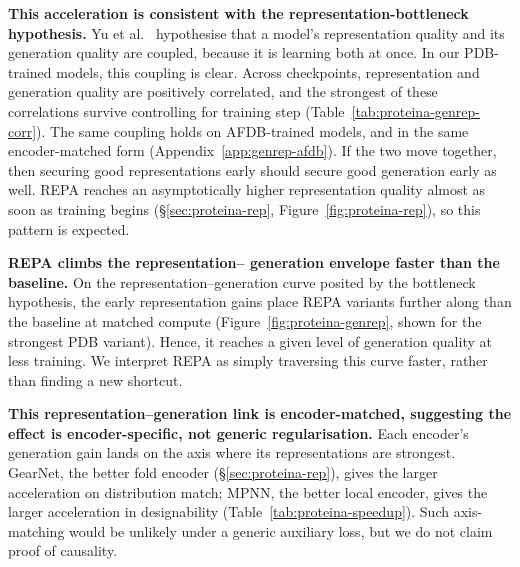 \documentclass[12pt,a4paper,twoside]{report}
\begin{document}
\textbf{This acceleration is consistent with the representation-bottleneck hypothesis.} Yu et al.~\cite{REPA} hypothesise that a model's representation quality and its generation quality are coupled, because it is learning both at once. In our PDB-trained models, this coupling is clear. Across checkpoints, representation and generation quality are positively correlated, and the strongest of these correlations survive controlling for training step (Table~\ref{tab:proteina-genrep-corr}). The same coupling holds on AFDB-trained models, and in the same encoder-matched form (Appendix~\ref{app:genrep-afdb}). If the two move together, then securing good representations early should secure good generation early as well. REPA reaches an asymptotically higher representation quality almost as soon as training begins (\S\ref{sec:proteina-rep}, Figure~\ref{fig:proteina-rep}), so this pattern is expected.



\textbf{REPA climbs the representation--
generation envelope faster than the baseline.} On the representation--generation curve posited by the bottleneck hypothesis, the early representation gains place REPA variants further along than the baseline at matched compute (Figure~\ref{fig:proteina-genrep}, shown for the strongest PDB variant). Hence, it reaches a given level of generation quality at less training. We interpret REPA as simply traversing this curve faster, rather than finding a new shortcut.



\textbf{This representation--generation link is encoder-matched, suggesting the effect is encoder-specific, not generic regularisation.} Each encoder's generation gain lands on the axis where its representations are strongest. GearNet, the better fold encoder (\S\ref{sec:proteina-rep}), gives the larger acceleration on distribution match; MPNN, the better local encoder, gives the larger acceleration in designability (Table~\ref{tab:proteina-speedup}). Such axis-matching would be unlikely under a generic auxiliary loss, but we do not claim proof of causality.

\end{document}
